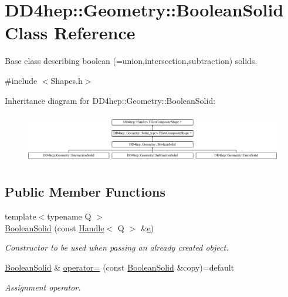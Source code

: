 \hypertarget{class_d_d4hep_1_1_geometry_1_1_boolean_solid}{}\section{D\+D4hep\+:\+:Geometry\+:\+:Boolean\+Solid Class Reference}
\label{class_d_d4hep_1_1_geometry_1_1_boolean_solid}


Base class describing boolean (=union,intersection,subtraction) solids.  




{\ttfamily \#include $<$Shapes.\+h$>$}

Inheritance diagram for D\+D4hep\+:\+:Geometry\+:\+:Boolean\+Solid\+:\begin{figure}[H]
\begin{center}
\leavevmode
\includegraphics[height=2.202557cm]{class_d_d4hep_1_1_geometry_1_1_boolean_solid}
\end{center}
\end{figure}
\subsection*{Public Member Functions}
\begin{DoxyCompactItemize}
\item 
{\footnotesize template$<$typename Q $>$ }\\\hyperlink{class_d_d4hep_1_1_geometry_1_1_boolean_solid_a4e13e5e8bb760f86027f144d1395965c}{Boolean\+Solid} (const \hyperlink{class_d_d4hep_1_1_handle}{Handle}$<$ Q $>$ \&\hyperlink{_volumes_8cpp_a8a9a1f93e9b09afccaec215310e64142}{e})
\begin{DoxyCompactList}\small\item\em Constructor to be used when passing an already created object. \end{DoxyCompactList}\item 
\hyperlink{class_d_d4hep_1_1_geometry_1_1_boolean_solid}{Boolean\+Solid} \& \hyperlink{class_d_d4hep_1_1_geometry_1_1_boolean_solid_a15562edb2d9b622c22fab2045de77d34}{operator=} (const \hyperlink{class_d_d4hep_1_1_geometry_1_1_boolean_solid}{Boolean\+Solid} \&copy)=default
\begin{DoxyCompactList}\small\item\em Assignment operator. \end{DoxyCompactList}\end{DoxyCompactItemize}
